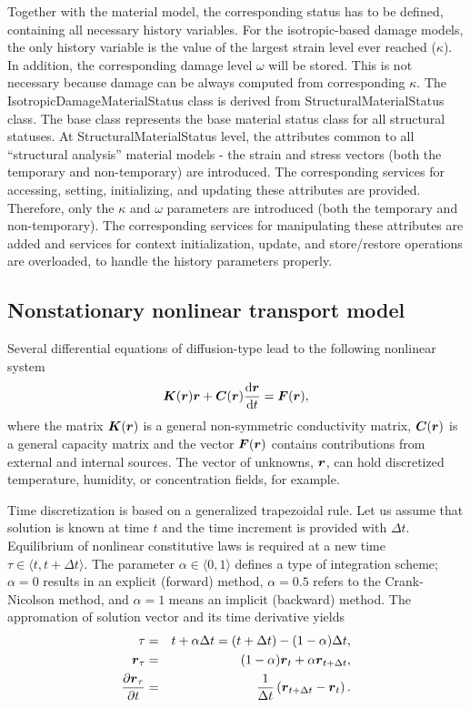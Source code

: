 \documentclass[a4paper]{article}
\newcommand{\mbf}[1]{\mbox{\boldmath$#1$}}
\begin{document}
 Together with the material model, the corresponding status has to be
 defined, containing all necessary history variables.
 For the isotropic-based damage models, the only history variable is
 the value of the largest strain level ever reached ($\kappa$).
 In addition, the corresponding damage level $\omega$ will be stored.
 This is not necessary because damage can be always computed from
 corresponding $\kappa$.
 The IsotropicDamageMaterialStatus class is derived from
 StructuralMaterialStatus class. The base class represents the
 base material status class for all structural statuses. At
 StructuralMaterialStatus level, the attributes common to all
 ``structural analysis'' material models - the strain and
 stress vectors (both the temporary and non-temporary) are introduced. The
 corresponding services for accessing, setting, initializing, and
 updating these attributes are provided.
 Therefore, only the $\kappa$ and $\omega$ parameters are introduced
 (both the temporary and non-temporary). The corresponding services for
 manipulating these attributes are added and services for context
 initialization, update, and store/restore operations are overloaded, to
 handle the history parameters properly.

\subsection{Nonstationary nonlinear transport model}
\label{NonNonTrans}

Several differential equations of diffusion-type lead to the following nonlinear system
\begin{eqnarray}
\mbf{K}(\mbf{r}) \mbf{r} + \mbf{C}(\mbf{r})\frac{{\rm d}\mbf{r}}{{\rm d} t} = \mbf{F}(\mbf{r})\label{NonNonTrans:1},
\end{eqnarray}
where the matrix $\mbf{K}(\mbf{r})$ is a general non-symmetric conductivity matrix, $\mbf{C}(\mbf{r})$ is a general capacity matrix and the vector $\mbf{F}(\mbf{r})$ contains contributions from external and internal sources. The vector of unknowns, $\mbf{r}$, can hold discretized temperature, humidity, or concentration fields, for example.

Time discretization is based on a generalized trapezoidal rule. Let us assume that solution is known at time $t$ and the time increment is provided with $\Delta t$. Equilibrium of nonlinear constitutive laws is required at a new time $\tau\in\langle t,t+\Delta t \rangle$. The parameter $\alpha\in\langle 0, 1\rangle$ defines a type of integration scheme; $\alpha=0$ results in an explicit (forward) method, $\alpha=0.5$ refers to the Crank-Nicolson method, and $\alpha=1$ means an implicit (backward) method. The appromation of solution vector and its time derivative yields
\begin{eqnarray}
\tau &=& t+\alpha\Delta t = (t+\Delta t) - (1-\alpha)\Delta t,\label{NonNonTrans:2}\\
\mbf{r}_{\tau} &=& (1-\alpha)\mbf{r}_t+\alpha\mbf{r}_{t+\Delta t},\label{NonNonTrans:3}\\
\frac{\partial{\mbf{r}_{\tau}}}{\partial t} &=& \frac{1}{\Delta t}\left(\mbf{r}_{t+\Delta t}-\mbf{r}_t\right).\label{NonNonTrans:4}
\end{eqnarray}
\end{document}
